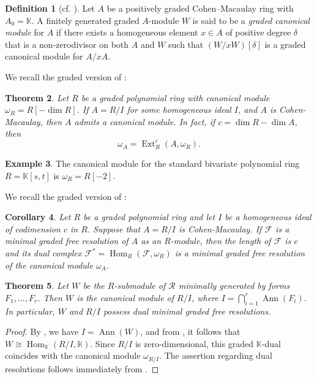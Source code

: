 \documentclass[a4paper, 11pt]{amsart}
\newtheorem{theorem}{Theorem}
\numberwithin{theorem}{section}
\newtheorem{corollary}[theorem]{Corollary}
\theoremstyle{definition}
\newtheorem{definition}[theorem]{Definition}
\newtheorem{example}[theorem]{Example}
\numberwithin{equation}{section}
\DeclareMathOperator{\Ann}{\operatorname{Ann}}
\begin{document}
\begin{definition}[cf. {\cite[Section~21.11]{MR1322960}}]
Let $A$ be a positively graded Cohen--Macaulay ring
with $A_0=\mathbb{K}$.
A finitely generated graded $A$-module $W$ is said to be a \emph{graded canonical module} for $A$ if there exists a homogeneous element $x\in A$ of positive degree $\delta$ that is a non-zerodivisor on both $A$ and $W$ such that $(W/xW)[\delta]$ is a graded canonical module for $A/xA$.
\end{definition}

We recall the graded version of \cite[Theorem 21.15]{MR1322960}:
\begin{theorem}\label{thm:eisenbud_ext}
Let $R$ be a graded polynomial ring with canonical module $\omega_R = R[-\dim R]$. If $A = R/I$ for some homogeneous ideal $I$, and $A$ is Cohen-Macaulay, then $A$ admits a canonical module. In fact, if $c = \dim R - \dim A$, then
\[
\omega_A = \operatorname{Ext}^c_R(A, \omega_R).
\]
\end{theorem}

\begin{example}
The canonical module for the standard bivariate polynomial ring $R = \mathbb{K}[s,t]$ is $\omega_R = R[-2]$.
\end{example}

We recall the graded version of \cite[Corollary 21.16]{MR1322960}:
\begin{corollary}\label{corollary:dual_resolutions}
Let $R$ be a graded polynomial ring and let $I$ be a homogeneous ideal of codimension $c$ in $R$. 
Suppose that $A = R/I$ is Cohen-Macaulay. 
If $\mathcal{F}$ is a minimal graded free resolution of $A$ as an $R$-module, then the length of $\mathcal{F}$ is $c$ and its dual complex $\mathcal{F}^* = \operatorname{Hom}_R(\mathcal{F}, \omega_R)$ is a minimal graded free resolution of the canonical module $\omega_A$.
\end{corollary}

\begin{theorem}\label{thm:canonical_w}
Let $W$ be the $R$-submodule of $\mathcal{R}$ minimally generated by forms $F_1, \dots, F_r$.
Then $W$ is the canonical module of $R/I$, where $I = \bigcap_{i=1}^r \Ann(F_i)$. In particular, $W$ and $R/I$ possess dual minimal graded free resolutions.
\end{theorem}

\begin{proof}
By , we have $I = \Ann(W)$, and from \cite[Lemma A.4]{MR4634294}, it follows that $W \cong \operatorname{Hom}_{\mathbb{K}}(R/I, \mathbb{K})$. Since $R/I$ is zero-dimensional, this graded $\mathbb{K}$-dual coincides with the canonical module $\omega_{R/I}$. The assertion regarding dual resolutions follows immediately from .

\end{proof}
\end{document}
